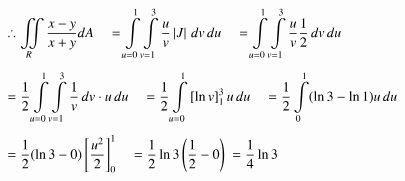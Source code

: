 \documentclass[11pt]{extarticle}
\newcommand{\du}{{\,du}}
\newcommand{\dv}{{\,dv}}
\newcommand{\mint}{\int\displaylimits}
\newcommand{\miint}{\iint\displaylimits}
\begin{document}
\begin{minipage}[t]{0.61\linewidth}
\noindent
   \begin{adjustbox}{valign=t}
      $\begin{aligned}
         & \therefore \miint_R \frac{x-y}{x+y} dA
         \quad = \mint_{u=0}^1 \mint_{v=1}^3 \frac{u}{v} \left| J \right| \dv\du
         \quad =\mint_{u=0}^1 \mint_{v=1}^3 \frac{u}{v} \frac{1}{2} \dv\du\\[1ex]
         & =\frac{1}{2} \mint_{u=0}^1 \mint_{v=1}^3 \frac{1}{v}\dv \cdot u\du
         \quad =\frac{1}{2} \mint_{u=0}^1 \left[\ln v\right]_1^3 u\du
         \quad =\frac{1}{2} \mint_0^1(\ln 3-\ln 1) u\du\\[1ex]
         & =\frac{1}{2}(\ln 3-0)\left[\frac{u^2}{2}\right]_0^1
         \quad =\frac{1}{2} \ln 3\left(\frac{1}{2}-0\right)\ =\frac{1}{4} \ln 3
      \end{aligned}$
   \end{adjustbox}
\end{minipage}\hspace{0.5ex}
\end{document}
